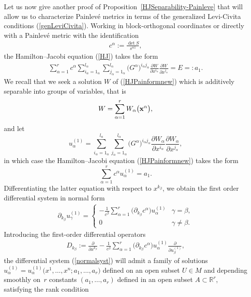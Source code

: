 \documentclass[pdftex]{sigma}
\numberwithin{equation}{section}
\newcommand{\ialpha}{i_{\alpha}}
\newcommand{\jalpha}{j_{\alpha}}
\newcommand{\kbeta}{k_{\beta}}
\newcommand{\lalpha}{l_{\alpha}}
\begin{document}
Let us now give another proof of Proposition~\ref{HJSeparability-Painleve} that will allow us to characterize Painlev\'e metrics in terms of the generalized Levi-Civita conditions (\ref{genLeviCivita}). Working in block-orthogonal coordinates or directly with a Painlev\'e metric with the identification
\begin{gather}\label{not}
c^\alpha:=\frac{\det S}{s^{\alpha 1}},
\end{gather}
the Hamilton--Jacobi equation (\ref{HJ}) takes the form
\begin{gather}\label{HJPainformnew}
\sum_{\alpha =1}^{r} c^\alpha \sum_{\ialpha =1_{\alpha}}^{\lalpha}\sum_{\jalpha =1_{\alpha}}^{\lalpha} \big(G^{\alpha}\big)^{\ialpha \jalpha}\frac{\partial W}{\partial x^{\ialpha} }\frac{\partial W}{\partial x^{\jalpha}}=E=:a_{1}.
\end{gather}
We recall that we seek a solution $W$ of (\ref{HJPainformnew}) which is additively separable into groups of variables, that is
\[
W=\sum_{\alpha =1}^{r}W_{\alpha}\big({\bf x}^{\alpha}\big),
\]
and let
\[
u_{\alpha}^{(1)}=\sum_{\ialpha =1_{\alpha}}^{\lalpha}\sum_{\jalpha =1_{\alpha}}^{\lalpha}\big(G^{\alpha}\big)^{\ialpha \jalpha}\frac{\partial W_{\alpha}}{\partial x^{\ialpha} }\frac{\partial W_{\alpha}}{\partial x^{\jalpha}},
\]
in which case the Hamilton--Jacobi equation (\ref{HJPainformnew}) takes the form
\[
\sum_{\alpha =1}^{r}c^{\alpha}u_{\alpha}^{(1)}=a_{1}.
\]
Differentiating the latter equation with respect to $x^{\kbeta}$, we obtain the first order differential system in normal form
\begin{gather}\label{normalsyst}
 \partial_{\kbeta}u^{(1)}_{\gamma} =   \begin{cases}\displaystyle -\frac{1}{c^{\beta}}\sum_{\alpha =1}^{r}\big(\partial_{\kbeta} c^{\alpha}\big) u^{(1)}_{\alpha} & \gamma = \beta, \\
 0 & \gamma \neq \beta . \end{cases}
\end{gather}
Introducing the first-order differential operators
\begin{gather}\label{totaldiff}
D_{\kbeta} := \frac{\partial}{\partial x^{\kbeta}}-\frac{1}{c^{\beta}}\sum_{\alpha =1}^{r}\big(\partial_{\kbeta} c^{\alpha}\big) u^{(1)}_{\alpha}\frac{\partial}{\partial u^{(1)}_{\beta}},
\end{gather}
the differential system (\ref{normalsyst}) will admit a family of solutions $u^{(1)}_{\alpha}=u^{(1)}_{\alpha}\big(x^{1},\dots,x^{n};a_{1},\dots,a_{r}\big)$ defined on an open subset $U\in M$ and depending smoothly on~$r$ constants $(a_{1},\dots,a_{r})$ defined in an open subset $A\subset {\mathbb{R}}^{r}$, satisfying the rank condition
\end{document}

